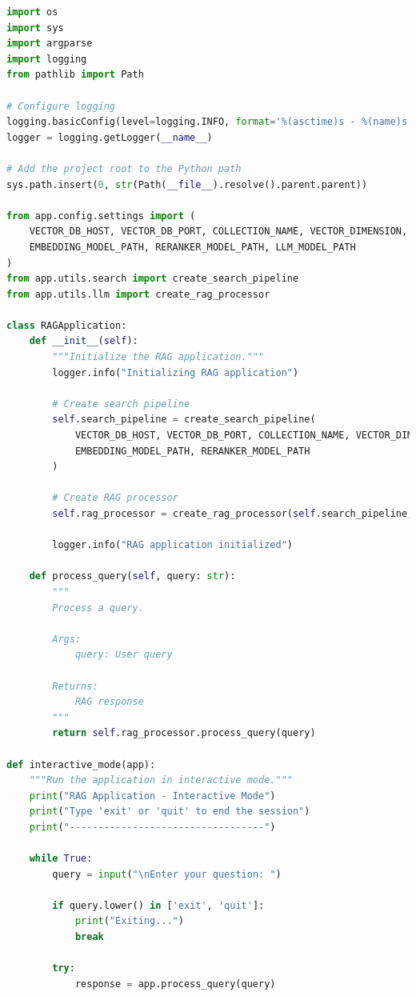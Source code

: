 \documentclass[
  screen,review,acmlarge]{acmart}
\begin{document}
\begin{lstlisting}[language=Python]
import os
import sys
import argparse
import logging
from pathlib import Path

# Configure logging
logging.basicConfig(level=logging.INFO, format='%(asctime)s - %(name)s - %(levelname)s - %(message)s')
logger = logging.getLogger(__name__)

# Add the project root to the Python path
sys.path.insert(0, str(Path(__file__).resolve().parent.parent))

from app.config.settings import (
    VECTOR_DB_HOST, VECTOR_DB_PORT, COLLECTION_NAME, VECTOR_DIMENSION,
    EMBEDDING_MODEL_PATH, RERANKER_MODEL_PATH, LLM_MODEL_PATH
)
from app.utils.search import create_search_pipeline
from app.utils.llm import create_rag_processor

class RAGApplication:
    def __init__(self):
        """Initialize the RAG application."""
        logger.info("Initializing RAG application")
        
        # Create search pipeline
        self.search_pipeline = create_search_pipeline(
            VECTOR_DB_HOST, VECTOR_DB_PORT, COLLECTION_NAME, VECTOR_DIMENSION,
            EMBEDDING_MODEL_PATH, RERANKER_MODEL_PATH
        )
        
        # Create RAG processor
        self.rag_processor = create_rag_processor(self.search_pipeline, LLM_MODEL_PATH)
        
        logger.info("RAG application initialized")
    
    def process_query(self, query: str):
        """
        Process a query.
        
        Args:
            query: User query
            
        Returns:
            RAG response
        """
        return self.rag_processor.process_query(query)

def interactive_mode(app):
    """Run the application in interactive mode."""
    print("RAG Application - Interactive Mode")
    print("Type 'exit' or 'quit' to end the session")
    print("----------------------------------")
    
    while True:
        query = input("\nEnter your question: ")
        
        if query.lower() in ['exit', 'quit']:
            print("Exiting...")
            break
        
        try:
            response = app.process_query(query)
            

\end{lstlisting}
\end{document}
